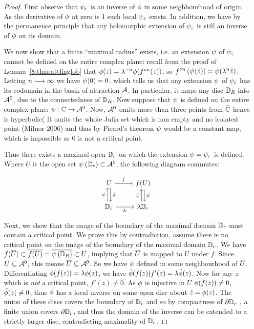 \documentclass[../main.tex]{subfiles}
\begin{document}
\begin{proof}
    First observe that $\psi_{\varepsilon}$ is an inverse of $\phi$ in some neighbourhood of origin. As the derivative of $\phi$ at zero is 1 such local  $\psi_{\varepsilon}$ exists. In addition, we have by the permanence principle that any holomorphic extension of $\psi_{\varepsilon}$ is still an inverse of $\phi$ on its domain. 
    
    We now show that a finite ``maximal radius'' exists, i.e. an extension $\psi$ of $\psi_{\varepsilon}$ cannot be defined on the entire complex plane: recall from the proof of Lemma~\ref{8:thm:attlinglob} that $\phi(z)=\lambda^{-n} \phi(f^{\circ n}(z))$, so $f^{\circ n}\left(\psi(\hat{z})\right)=\psi(\lambda^n\hat{z})$. Letting $n\longrightarrow\infty$ we have $\psi(0)=0$, which tells us that any extension $\psi$ of $\psi_{\varepsilon}$ has its codomain in the basin of attraction $\mathcal{A}$. In particular, it maps any disc $\mathbb{D}_R$ into $\mathcal{A}^0$, due to the connectedness of $\mathbb{D}_R$. Now suppose that $\psi$ is defined on the entire complex plane:  $\psi:\mathbb{C}\to\mathcal{A}^0$. Now, $\mathcal{A}^0$ omits more than three points from $\widehat{\mathbb{C}}$ hence is hyperbolic( It omits the whole Julia set which is non empty and no isolated point (Milnor 2006) and thus by Picard's theorem $\psi$ would be a constant map, which is impossible as 0 is not a critical point.
    
    Thus there exists a maximal open $\mathbb{D}_{r}$ on which the extension $\psi=\psi_r$ is defined. Where $U$ is the open set $\psi\left(\mathbb{D}_{r}\right) \subset \mathcal{A}^{0}$, the following diagram commutes:
    
    \begin{equation*}
        \begin{tikzcd}
        U \ar[r, "f"] \ar[d, "\linT", shift left] & f(U) \ar[d, "\linT", shift left] \\
        \D_r \ar[u, "\linV", shift left] \ar[r, "\lambda \cdot"'] & \lambda\D_r \ar[u, "\linV", shift left]
        \end{tikzcd}
    \end{equation*}

    Next, we show that the image of the boundary of the maximal domain $\mathbb{D}_r$ must contain a critical point.
    We prove this by contradiction, assume there is no critical point on the image of the boundary of the maximal domain $\mathbb{D}_r$.
    We have $f(\overline{U})\subset\overline{f(U)}=\overline{\psi\left(\mathbb{D}_R\right)} \subset U$,
    implying that $\overline{U}$ is mapped to $U $ under $f$. Since $U\subseteq\mathcal{A}^0$, this means $\overline{U} \subseteq\mathcal{A}^0$. So we have $\phi$ defined in some neighbourhood of $\overline{U}$. Differentiating $\phi(f(z))=\lambda \phi(z)$, we have $\tilde{\phi}(f(z)) f'(z)=\lambda \tilde{\phi}(z)$. Now for any $z$ which is \emph{not} a critical point, $ f'(z) \neq 0$. As $\phi$ is injective in $U$ $\tilde{\phi}(f(z))\neq 0$, $\tilde{\phi}(z)\neq 0$, thus $\phi$ has a local inverse on some open disc about $\hat{z}=\phi(z)$. The union of these discs covers the boundary of $\mathbb{D}_{r}$ and so by compactness of $\partial \mathbb{D}_{r}$ 
     , a finite union covers $\partial\mathbb{D}_{r}$, and thus the domain of the inverse can be extended to a strictly larger disc, contradicting maximality of $\mathbb{D}_{r}$.
   

\end{proof}
\end{document}
